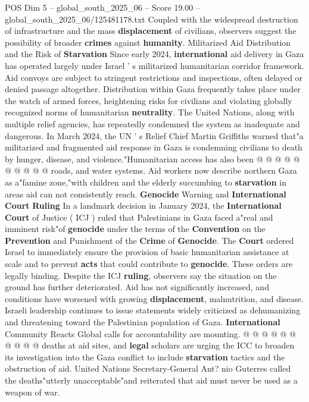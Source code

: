 \begin{textsample}{POS Dim 5 – global\_south\_2025\_06 – Score 19.00 – global\_south\_2025\_06/125481178.txt}
Coupled with the widespread destruction of infrastructure and the mass \textbf{displacement} of civilians, observers suggest the possibility of broader \textbf{crimes} against \textbf{humanity}.
Militarized Aid Distribution and the Risk of \textbf{Starvation} Since early 2024, \textbf{international} aid delivery in Gaza has operated largely under Israel ' s militarized humanitarian corridor framework.
Aid convoys are subject to stringent restrictions and inspections, often delayed or denied passage altogether.
Distribution within Gaza frequently takes place under the watch of armed forces, heightening risks for civilians and violating globally recognized norms of humanitarian \textbf{neutrality}.
The United Nations, along with multiple relief agencies, has repeatedly condemned the system as inadequate and dangerous.
In March 2024, the UN ' s Relief Chief Martin Griffiths warned that"a militarized and fragmented aid response in Gaza is condemning civilians to death by hunger, disease, and violence."Humanitarian access has also been @ @ @ @ @ @ @ @ @ @ roads, and water systems.
Aid workers now describe northern Gaza as a"famine zone,"with children and the elderly succumbing to \textbf{starvation} in areas aid can not consistently reach. \textbf{Genocide} Warning and \textbf{International} \textbf{Court} \textbf{Ruling} In a landmark decision in January 2024, the \textbf{International} \textbf{Court} of Justice ( ICJ ) ruled that Palestinians in Gaza faced a"real and imminent risk"of \textbf{genocide} under the terms of the \textbf{Convention} on the \textbf{Prevention} and Punishment of the \textbf{Crime} of \textbf{Genocide}.
The \textbf{Court} ordered Israel to immediately ensure the provision of basic humanitarian assistance at scale and to prevent \textbf{acts} that could contribute to \textbf{genocide}.
These orders are legally binding.
Despite the ICJ \textbf{ruling}, observers say the situation on the ground has further deteriorated.
Aid has not significantly increased, and conditions have worsened with growing \textbf{displacement}, malnutrition, and disease.
Israeli leadership continues to issue statements widely criticized as dehumanizing and threatening toward the Palestinian population of Gaza. \textbf{International} Community Reacts Global calls for accountability are mounting. @ @ @ @ @ @ @ @ @ @ deaths at aid sites, and \textbf{legal} scholars are urging the ICC to broaden its investigation into the Gaza conflict to include \textbf{starvation} tactics and the obstruction of aid.
United Nations Secretary-General Ant? nio Guterres called the deaths"utterly unacceptable"and reiterated that aid must never be used as a weapon of war.

\end{textsample}
